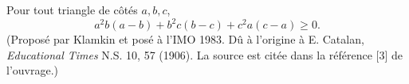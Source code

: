 Pour tout triangle de côtés $a, b, c$,
\[ a^2b(a - b) + b^2c(b - c) + c^2a(c - a) \geq 0. \]
(Proposé par Klamkin et posé à l'IMO 1983. Dû à l'origine à E. Catalan, \emph{Educational Times} N.S. 10, 57 (1906). La source est citée dans la référence [3] de l'ouvrage.)
